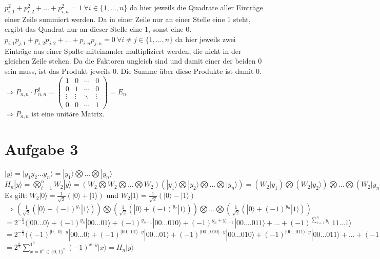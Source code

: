 \documentclass[a4paper]{scrartcl}
\begin{document}
$p_{i,1}^2+p_{i,2}^2+...+p_{i,n}^2=1~\forall i \in \{1,...,n\}$ da hier jeweils die Quadrate aller Einträge einer Zeile summiert werden. Da in einer Zeile nur an einer Stelle eine 1 steht, ergibt das Quadrat nur an dieser Stelle eine 1, sonst eine 0.\\
$p_{i,1}p_{j,1}+p_{i,2}p_{j,2}+...+p_{i,n}p_{j,n} = 0~\forall i\neq j \in \{1,...,n\}$ da hier jeweils zwei Einträge aus einer Spalte miteinander multipliziert werden, die nicht in der gleichen Zeile stehen. Da die Faktoren ungleich sind und damit einer der beiden 0 sein muss, ist das Produkt jeweils 0. Die Summe über diese Produkte ist damit 0.\\
$\Rightarrow P_{n,n} \cdot P_{n,n}^{\dagger} =
\begin{pmatrix}
1 & 0 & \cdots & 0 \\
0 & 1 & \cdots & 0 \\
\vdots  & \vdots  & \ddots & \vdots  \\
0 & 0 & \cdots & 1 
\end{pmatrix} = E_n$\\
$\Rightarrow P_{n,n}$ ist eine unitäre Matrix.

\newpage
\section*{Aufgabe 3}
$|y\rangle = |y_1 y_2...y_n\rangle = |y_1\rangle \bigotimes ... \bigotimes |y_n\rangle$\\
$H_n|y\rangle =\bigotimes_{i=1}^nW_2|y\rangle =(W_2\bigotimes W_2\bigotimes ... \bigotimes W_2)(|y_1\rangle \bigotimes |y_2\rangle \bigotimes ... \bigotimes |y_n\rangle) = (W_2|y_1)\bigotimes (W_2|y_2\rangle)\bigotimes ... \bigotimes (W_2|y_n\rangle)$\\
Es gilt: $W_2|0\rangle = \frac{1}{\sqrt{2}}(|0\rangle + |1\rangle)$ und $W_2|1\rangle = \frac{1}{\sqrt{2}}(|0\rangle - |1\rangle)$\\
$\Rightarrow (\frac{1}{\sqrt{2}}(|0\rangle + (-1)^{y_1}|1\rangle ))\bigotimes (\frac{1}{\sqrt{2}}(|0\rangle + (-1)^{y_2} |1\rangle)) \bigotimes ... \bigotimes (\frac{1}{\sqrt{2}}(|0\rangle + (-1)^{y_n}|1\rangle))$\\
$=  2^{-\frac{n}{2}}(|00...0\rangle + (-1)^{y_n}|00...01\rangle+ (-1)^{y_{n-1}}|00...010\rangle + (-1)^{y_n+y_{n-1}}|00....011\rangle + ... + (-1)^{\sum_{i=1}^n y_i}|11...1\rangle$\\
$=  2^{-\frac{n}{2}}((-1)^{|0...0\rangle \cdot y }|00...0\rangle + (-1)^{|00...01\rangle \cdot y}|00...01\rangle+ (-1)^{|00...010\rangle \cdot y}|00...010\rangle + (-1)^{|00...011\rangle \cdot y}|00...011\rangle + ... + (-1)^{|11...1\rangle \cdot y}|11...1\rangle$\\
$= 2^\frac{n}{2}\sum_{x = 0^n \in \{0,1\}^n}^{1^n}(-1)^{x\cdot y}|x\rangle = H_n|y\rangle$
\end{document}
